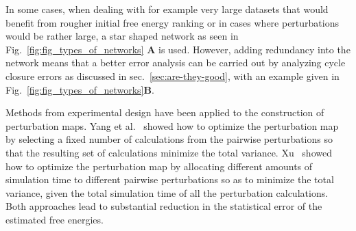 \documentclass[9pt,bestpractices,pubversion]{livecoms}
\begin{document}
In some cases, when dealing with for example very large datasets that would benefit from rougher initial free energy ranking or in cases where perturbations would be rather large, a star shaped network as seen in Fig.~\ref{fig:fig_types_of_networks} \textbf{A} is used. However, adding redundancy into the network means that a better error analysis can be carried out by analyzing cycle closure errors as discussed in sec.~\ref{sec:are-they-good}, with an example given in Fig.~\ref{fig:fig_types_of_networks}\textbf{B}.


Methods from experimental design have been applied to the construction of perturbation maps. Yang et al.~\cite{yang2020optimal} showed how to optimize the perturbation map by selecting a fixed number of calculations from the pairwise perturbations so that the resulting set of calculations minimize the total variance. Xu~\cite{xu2019optimal} showed how to optimize the perturbation map by allocating different amounts of simulation time to different pairwise perturbations so as to minimize the total variance, given the total simulation time of all the perturbation calculations. Both approaches lead to substantial reduction in the statistical error of the estimated free energies. 
\end{document}
